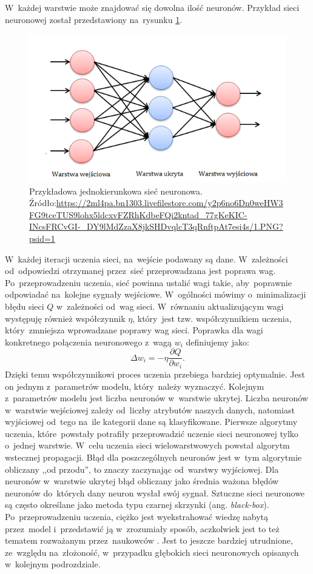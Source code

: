\noindent
W~każdej warstwie może znajdować się dowolna ilość neuronów. Przykład sieci neuronowej został przedstawiony na~rysunku \ref{net}.
\begin{figure}[ht!]
\centering
\includegraphics{res/exampleNet.png}
\caption[Caption for LOF]{Przykładowa jednokierunkowa sieć neuronowa. Źródło:\url{https://2ml4pa.bn1303.livefilestore.com/y2p6no6Dn0weHW3FG9tceTUS9lohx5ldcxvFZRhKdbeFQi2kntad_77gKeKIC-INcsFRCvGI-_DY9lMdZzaX8jkSHDvqlcT3qRnftpAt7esi4s/1.PNG?psid=1}\label{net}} 
\end{figure}
\noindent
W~każdej iteracji uczenia sieci, na~wejście podawany są dane. W~zależności od~odpowiedzi otrzymanej przez~sieć przeprowadzana jest poprawa wag. Po~przeprowadzeniu uczenia, sieć powinna ustalić wagi takie, aby~poprawnie odpowiadać na~kolejne sygnały wejściowe. W~ogólności mówimy o~minimalizacji błędu sieci $Q$ w~zależności od~wag sieci. W~równaniu aktualizującym wagi występuję również współczynnik $\eta$, który~jest tzw. współczynnikiem uczenia, który~zmniejsza wprowadzane poprawy wag sieci. Poprawka dla wagi konkretnego połączenia neuronowego z~wagą $w_i$ definiujemy jako:
\begin{equation}\label{deltaRule}
\Delta w_i = - \eta \frac{\partial Q}{\partial w_i}.
\end{equation}
Dzięki temu współczynnikowi proces uczenia przebiega bardziej optymalnie. Jest on jednym z~parametrów modelu, który~należy wyznaczyć. Kolejnym z~parametrów modelu jest liczba neuronów w~warstwie ukrytej. Liczba neuronów w~warstwie wejściowej zależy od~liczby atrybutów naszych danych, natomiast wyjściowej od~tego na~ile kategorii dane są klasyfikowane. Pierwsze algorytmy uczenia, które~powstały potrafiły przeprowadzić uczenie sieci neuronowej tylko o~jednej warstwie. W~celu uczenia sieci wielowarstwowych powstał algorytm wstecznej propagacji. Błąd dla poszczególnych neuronów jest w~tym algorytmie obliczany ,,od przodu'', to znaczy zaczynając od~warstwy wyjściowej. Dla neuronów w~warstwie ukrytej błąd obliczany jako średnia ważona błędów neuronów do~których dany neuron wysłał swój sygnał. Sztuczne sieci neuronowe są często określane jako metoda typu czarnej skrzynki (ang. \textit{black-box}). Po~przeprowadzeniu uczenia, ciężko jest wyekstrahować wiedzę nabytą przez~model i~przedstawić ją w~zrozumiały sposób, aczkolwiek jest to też tematem rozważanym przez~naukowców \cite{blacboxann}. Jest to jeszcze bardziej utrudnione, ze~względu na~złożoność, w~przypadku głębokich sieci neuronowych opisanych w~kolejnym podrozdziale.

